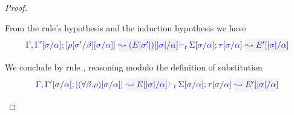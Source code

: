 \begin{proof}
\begin{description}
  From the rule's hypothesis and the induction hypothesis we have 
\begin{equation*}
  \dmres{\tenv,\tenv'[\suty/\alpha]}{\rulet[\suty'/\beta][\suty/\alpha]}{(E |\suty'|)[|\suty|/\alpha]}{\type[\suty/\alpha]}{E'[|\suty|/\alpha]}{\Sigma[\suty/\alpha]}
\end{equation*}

  We conclude by rule , reasoning modulo
  the definition of substitution
\begin{equation*}
  \dmres{\tenv,\tenv'[\suty/\alpha]}{(\tall{\beta}{\rulet})[\suty/\alpha]}{E[|\suty|/\alpha]}{\type[\suty/\alpha]}{E'[|\suty|/\alpha]}{\Sigma[\suty/\alpha]}
\end{equation*}
\end{description}
\end{proof}



